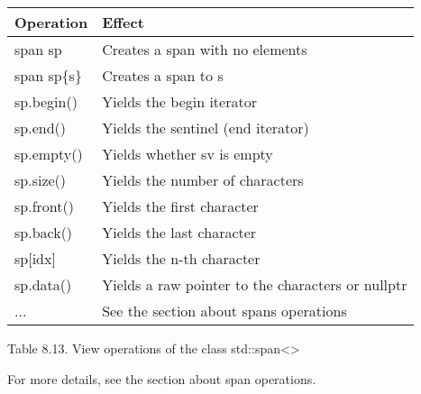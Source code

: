 \begin{longtable}[c]{|l|l|}
\hline
\textbf{Operation} & \textbf{Effect}                                   \\ \hline
\endfirsthead
%
\endhead
%
span sp            & Creates a span with no elements                   \\ \hline
span sp\{s\}       & Creates a span to s                               \\ \hline
sp.begin()         & Yields the begin iterator                         \\ \hline
sp.end()           & Yields the sentinel (end iterator)                \\ \hline
sp.empty()         & Yields whether sv is empty                        \\ \hline
sp.size()          & Yields the number of characters                   \\ \hline
sp.front()         & Yields the first character                        \\ \hline
sp.back()          & Yields the last character                         \\ \hline
sp{[}idx{]}        & Yields the n-th character                         \\ \hline
sp.data()          & Yields a raw pointer to the characters or nullptr \\ \hline
...                & See the section about spans operations            \\ \hline
\end{longtable}

\begin{center}
Table 8.13. View operations of the class std::span<>
\end{center}

For more details, see the section about span operations.









